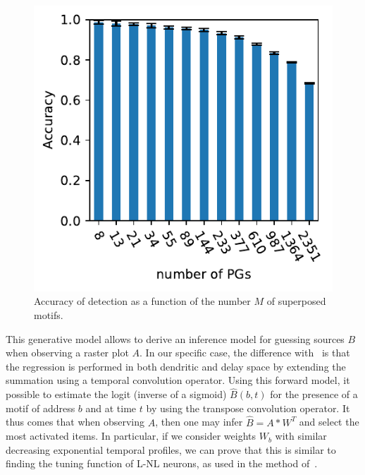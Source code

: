\documentclass[11pt]{article}
\begin{document}
\begin{figure}
%
\includegraphics[width=\linewidth]{figure_N_PGs.pdf}
\vspace{-25pt}
{
\caption{Accuracy of detection as a function of the number $M$ of superposed motifs.
}
\label{fig:2}
}
\end{figure}
This generative model allows to derive an inference model for guessing sources $B$ when observing a raster plot $A$. 
In our specific case, the difference with~\parencite{russo_cell_2017, stella_3d-spade_2019} is that the regression is performed in both dendritic and delay space by extending the summation using a temporal convolution operator. Using this forward model, it possible to estimate the logit (inverse of a sigmoid) $\hat{B}(b, t)$ for the presence of a motif of address $b$ and at time $t$ by using the transpose convolution operator. It thus comes that when observing $A$, then one may infer $\hat{B} = A \ast W^T$ and select the most activated items. In particular, if we consider weights $W_b$ with similar decreasing exponential temporal profiles, we can prove that this is similar to finding the tuning function of L-NL neurons, as used in the method of~\parencite{berens_fast_2012}.
\end{document}
